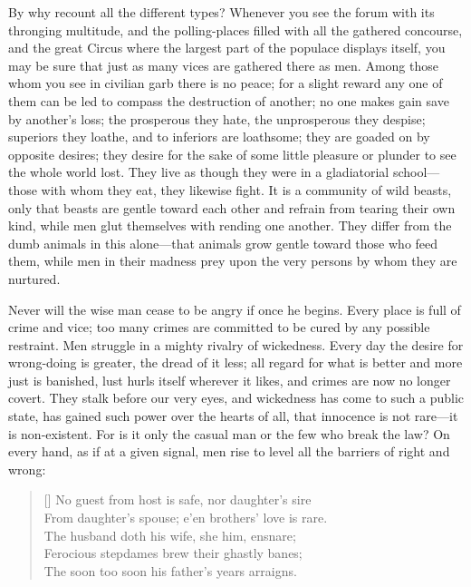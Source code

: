 By why recount all the different types? Whenever you see the forum
with its thronging multitude, and the polling-places filled with all
the gathered concourse, and the great Circus where the largest part of
the populace displays itself, you may be sure that just as many vices
are gathered there as men. Among those whom you see in civilian garb
there is no peace; for a slight reward any one of them can be led to
compass the destruction of another; no one makes gain save by
another's loss; the prosperous they hate, the unprosperous they
despise; superiors they loathe, and to inferiors are loathsome; they
are goaded on by opposite desires; they desire for the sake of some
little pleasure or plunder to see the whole world lost. They live as
though they were in a gladiatorial school---those with whom they eat,
they likewise fight. It is a community of wild beasts, only that
beasts are gentle toward each other and refrain from tearing their own
kind, while men  glut themselves with rending one another.
They differ from the dumb animals in this a\-lone---that animals grow
gentle toward those who feed them, while men in their madness prey
upon the very persons by whom they are nurtured.

Never will the wise man cease to be angry if once he begins. Every
place is full of crime and vice; too many crimes are committed to be
cured by any possible restraint. Men struggle in a mighty rivalry of
wickedness. Every day the desire for wrong-doing is greater, the dread
of it less; all regard for what is better and more just is banished,
lust hurls itself wherever it likes, and crimes are now no longer
covert. They stalk before our very eyes, and wickedness has come to
such a public state, has gained such power over the hearts of all,
that innocence is not rare---it is non-existent. For is it only the
casual man or the few who break the law? On every hand, as if at a
given signal, men rise to level all the barriers of right and wrong:

\settowidth{}
\begin{verse}[\versewidth]
No guest from host is safe, nor daughter's sire\\
From daughter's spouse; e'en brothers' love is rare.\\
The husband doth his wife, she him, ensnare;\\
Ferocious stepdames brew their ghastly banes;\\
The soon too soon his father's years arraigns.
\end{verse}


